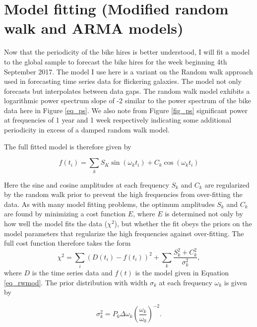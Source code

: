 \documentclass[10pt]{article}
\begin{document}
\section{Model fitting (Modified random walk and ARMA models)}
\label{sec_model}


Now that the periodicity of the bike hires is better understood, I will fit a model to the global sample to forecast the bike hires for the week beginning 4th September 2017. The model I use here is a variant on the Random walk approach used in forecasting time series data for flickering galaxies. The model not only forecasts but interpolates between data gaps. The random walk model exhibits a logarithmic power spectrum slope of -2 similar to the power spectrum of the bike data here in Figure \ref{eq_ps}. We also note from Figure \ref{fig_ps} significant power at frequencies of 1 year and 1 week respectively indicating some additional periodicity in excess of a damped random walk model.

The full fitted model is therefore given by

\begin{equation}
\label{eq_rwmod}
f(t_i) = \sum_k S_K \sin \left( \omega_k t_i \right) + C_k \cos \left( \omega_k t_i \right)
\end{equation}

Here the sine and cosine amplitudes at each frequency $S_k$ and $C_k$ are regularized by the random walk prior to prevent the high frequencies from over-fitting the data. As with many model fitting problems, the optimum amplitudes $S_k$ and $C_k$ are found by minimizing a cost function $E$, where $E$ is determined not only by how well the model fits the data ($\chi^2$), but whether the fit obeys the priors on the model parameters that regularize the high frequencies against over-fitting. The full cost function therefore takes the form 
\begin{equation}
\label{eq_cost}
\chi^2 = \sum_i \left( D(t_i)-f(t_i) \right)^2 + \sum_k \frac{ S_k^2 + C_k^2 }{\sigma_k^2} ,
\end{equation}
\noindent where $D$ is the time series data and $f(t)$ is the model given in Equation \ref{eq_rwmod}. The prior distribution with width $\sigma_k$ at each frequency $\omega_k$ is given by

\begin{equation}
\label{eq_prior}
\sigma_k^2 = P_0 \Delta \omega_k \left( \frac{\omega_k}{\omega_0}\right)^{-2}.
\end{equation}
\end{document}
